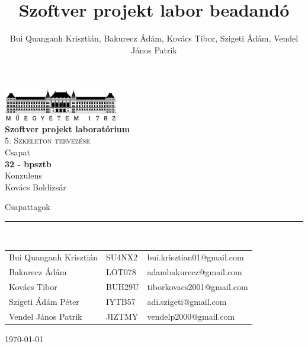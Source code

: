 \documentclass[12pt, a4paper]{book}
\title{Szoftver projekt labor beadandó}
\author{Bui Quanganh Krisztián, Bakurecz Ádám, Kovács Tibor, Szigeti Ádám, Vendel János Patrik}
\begin{document}
\begin{titlepage} 
	\begin{center}
		\includegraphics[width=5cm]{docs/img/BMElogo}\\ 
		\vspace{1cm}
		\LARGE{\bfseries{Szoftver projekt laboratórium}}\\
		\vspace{0.5cm}
		\Large\textsc{5. Szkeleton tervezése}\\
		\vspace{1cm}
		\small{Csapat}\\
		\Large{\bfseries{32 - bpsztb}}\\
		\vspace{1cm}
		\small{Konzulens}\\
		\Large{Kovács Boldizsár}
	\end{center}
	\begin{flushleft}
		\vspace*{6cm}
		Csapattagok\\
		\vspace{-0.3cm}
		\rule{14cm}{0.5pt}\\
		\vspace{0.2cm}
		\begin{tabular}{l l l} %
			Bui Quanganh Krisztián & SU4NX2 & bui.krisztian01@gmail.com \\
			Bakurecz Ádám & LOT078 & adambakurecz@gmail.com \\
			Kovács Tibor & BUH29U & tiborkovacs2001@gmail.com  \\
			Szigeti Ádám Péter & IYTB57 & adi.szigeti@gmail.com \\
			Vendel János Patrik & JIZTMY & vendelp2000@gmail.com \\
		\end{tabular}
	\end{flushleft}
	\begin{flushright}
		\vspace*{2cm}
		\today   %
	\end{flushright}
\end{titlepage}

\sloppy

\end{document}
